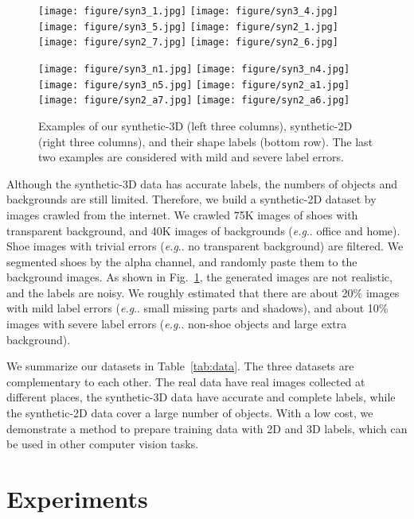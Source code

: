 \documentclass[runningheads]{llncs}
\makeatletter
\DeclareRobustCommand\onedot{\futurelet\@let@token\@onedot}
\def\@onedot{\ifx\@let@token.\else.\null\fi\xspace}
\def\eg{\emph{e.g}\onedot} \def\Eg{\emph{E.g}\onedot}
\makeatother
\begin{document}
\begin{figure}[t]
    \centering
    \texttt{[image: figure/syn3\_1.jpg]}
    \texttt{[image: figure/syn3\_4.jpg]}
    \texttt{[image: figure/syn3\_5.jpg]}
    \texttt{[image: figure/syn2\_1.jpg]}
    \texttt{[image: figure/syn2\_7.jpg]}
    \texttt{[image: figure/syn2\_6.jpg]}
    
    \texttt{[image: figure/syn3\_n1.jpg]}
    \texttt{[image: figure/syn3\_n4.jpg]}
    \texttt{[image: figure/syn3\_n5.jpg]}
    \texttt{[image: figure/syn2\_a1.jpg]}
    \texttt{[image: figure/syn2\_a7.jpg]}
    \texttt{[image: figure/syn2\_a6.jpg]}
    \caption{Examples of our synthetic-3D (left three columns), synthetic-2D (right three columns), and their shape labels (bottom row). The last two examples are considered with mild and severe label errors.}
    \label{fig:syn}
\end{figure}

Although the synthetic-3D data has accurate labels, the numbers of objects and backgrounds are still limited. Therefore, we build a synthetic-2D dataset by images crawled from the internet. We crawled 75K images of shoes with transparent background, and 40K images of backgrounds (\eg office and home). Shoe images with trivial errors (\eg no transparent background) are filtered. We segmented shoes by the alpha channel, and randomly paste them to the background images. As shown in Fig.~\ref{fig:syn}, the generated images are not realistic, and the labels are noisy. We roughly estimated that there are about 20\% images with mild label errors (\eg small missing parts and shadows), and about 10\% images with severe label errors (\eg non-shoe objects and large extra background).

We summarize our datasets in Table~\ref{tab:data}. The three datasets are complementary to each other. The real data have real images collected at different places, the synthetic-3D data have accurate and complete labels, while the synthetic-2D data cover a large number of objects. With a low cost, we demonstrate a method to prepare training data with 2D and 3D labels, which can be used in other computer vision tasks.


\section{Experiments}
\end{document}
